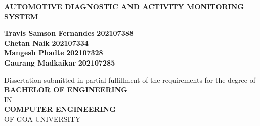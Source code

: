 \begin{titlepage}
    
    \centering
    \vspace*{0.5cm}
    
    {\Large \textbf{AUTOMOTIVE DIAGNOSTIC AND ACTIVITY MONITORING SYSTEM }}\\[0.5cm]

    \large
    \begin{center}
        {\textbf{Travis Samson Fernandes}} \hspace{0.8cm} {\textbf{202107388}}\\
        {\textbf{Chetan Naik}} \hspace{3.6cm} {\textbf{202107334}}\\
        {\textbf{Mangesh Phadte}} \hspace{2.8cm} {\textbf{202107328}}\\
        {\textbf{Gaurang Madkaikar}} \hspace{1.9cm} {\textbf{202107285}}
    \end{center}
    
    {\normalsize {Dissertation submitted in partial fulfillment of the requirements for the degree of }}\\[0.3cm]

    {\large \textbf{BACHELOR OF ENGINEERING}}\\[0.3cm]
    {\large {IN}}\\[0.3cm]
    {\large \textbf{COMPUTER ENGINEERING}}\\[0.3cm]
    {\large {OF GOA UNIVERSITY}}\\[1cm]
    

\end{titlepage}
